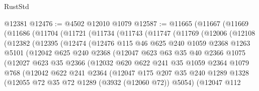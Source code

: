 \begin{lexlean}{RustStd}
\begin{coremodule}
    @12381
@12476 := @4502 @12010 @1079
@12587 := @11665
    (@11667
      (@11669
        (@11686
          (@11704
            (@11721
              (@11734
                (@11743
                  (@11747
                    (@11769
                      (@12006
                        (@12108
                          (@12382
                            (@12395
                              (@12474
                                (@12476
                                  @115
                                  @46
                                  @625
                                  @240
                                  @1059
                                  @2368
                                  @1263
                                  @5101
                                  (@12042
                                    @625
                                    @240
                                    @2368
                                    (@12047
                                      @623
                                      @63
                                      @35
                                      @40
                                      @2366
                                      @1075
                                      (@12027
                                        @623
                                        @35
                                        @2366
                                        (@12032
                                          @620
                                          @622
                                          @241
                                          @35
                                          @1059
                                          @2364
                                          @1079
                                          @768
                                          (@12042
                                            @622
                                            @241
                                            @2364
                                            (@12047
                                              @175
                                              @207
                                              @35
                                              @240
                                              @1289
                                              @1328
                                              (@12055 @72 @35 @72 @1289 (@3932 (@12060 @72)) @5054)
                                              (@12047
                                                @112

\end{coremodule}
\end{lexlean}
